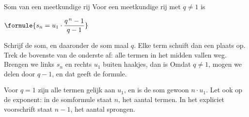 \begin{theorie}
\begin{stelling}{Som van een meetkundige rij}
Voor een meetkundige rij met $q \neq 1$ is

\vspace{1mm}
\qquad $\formule{s_n = u_1 \cdot \dfrac{q^{\,n} - 1}{q - 1}}$
\end{stelling}

\begin{bewijs}
Schrijf de som, en daaronder de som maal $q$. Elke term schuift dan een plaats op. Trek de bovenste van de onderste af: alle termen in het midden vallen weg.
Brengen we links $s_n$ en rechts $u_1$ buiten haakjes, dan is
Omdat $q \neq 1$, mogen we delen door $q - 1$, en dat geeft de formule.
\end{bewijs}
\end{theorie}

Voor $q = 1$ zijn alle termen gelijk aan $u_1$, en is de som gewoon $n \cdot u_1$. Let ook op de exponent: in de somformule staat $n$, het aantal termen. In het expliciet voorschrift staat $n - 1$, het aantal sprongen.



\begin{oefeningen}
\end{oefeningen}

